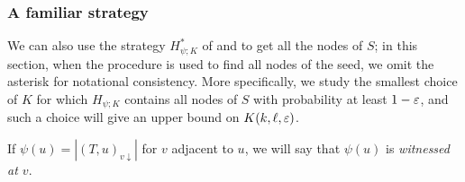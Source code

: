 \subsubsection{A familiar strategy}

We can also use the strategy $H^*_{\psi; K}$ of \cite{finding-adam}
and  to get all the nodes of $S$; in this section,
when the procedure is used to find all nodes of the seed, we omit the
asterisk for notational consistency. More specifically, we study the
smallest choice of $K$ for which $H_{\psi; K}$ contains all nodes of
$S$ with probability at least $1 - \varepsilon$, and such a choice will give
an upper bound on $K(k, \ell, \varepsilon)$.

If $\psi(u) = |(T, u)_{v \downarrow}|$ for $v$ adjacent to $u$, we
will say that $\psi(u)$ is \emph{witnessed at $v$}.

